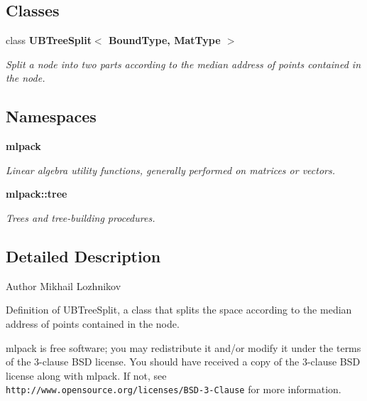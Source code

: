 \subsection*{Classes}
\begin{DoxyCompactItemize}
\item 
class \textbf{ U\+B\+Tree\+Split$<$ Bound\+Type, Mat\+Type $>$}
\begin{DoxyCompactList}\small\item\em Split a node into two parts according to the median address of points contained in the node. \end{DoxyCompactList}\end{DoxyCompactItemize}
\subsection*{Namespaces}
\begin{DoxyCompactItemize}
\item 
 \textbf{ mlpack}
\begin{DoxyCompactList}\small\item\em Linear algebra utility functions, generally performed on matrices or vectors. \end{DoxyCompactList}\item 
 \textbf{ mlpack\+::tree}
\begin{DoxyCompactList}\small\item\em Trees and tree-\/building procedures. \end{DoxyCompactList}\end{DoxyCompactItemize}


\subsection{Detailed Description}
\begin{DoxyAuthor}{Author}
Mikhail Lozhnikov
\end{DoxyAuthor}
Definition of U\+B\+Tree\+Split, a class that splits the space according to the median address of points contained in the node.

mlpack is free software; you may redistribute it and/or modify it under the terms of the 3-\/clause B\+SD license. You should have received a copy of the 3-\/clause B\+SD license along with mlpack. If not, see {\tt http\+://www.\+opensource.\+org/licenses/\+B\+S\+D-\/3-\/\+Clause} for more information. 